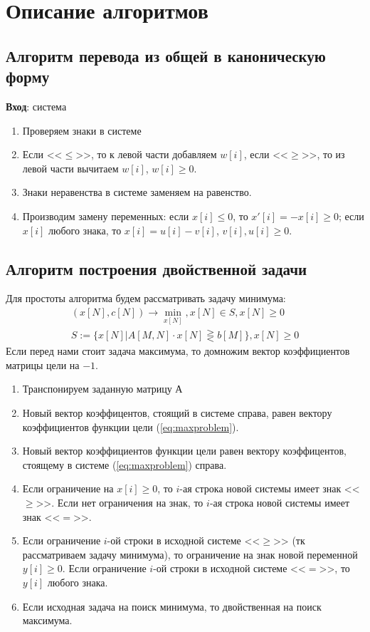 \documentclass[main.tex]{subfiles}
\begin{document}
	\newpage
	\section{Описание алгоритмов}
	\subsection{Алгоритм перевода из общей в каноническую форму}
	\textbf{Вход}: система
	\begin{enumerate}
		\item Проверяем знаки в системе
		\item Если <<$\le$>>, то к левой части добавляем $w[i]$, если <<$\ge$>>, то из левой части вычитаем $w[i]$, $w[i]\ge0$.
		\item Знаки неравенства в системе заменяем на равенство.
		\item Производим замену переменных: если $x[i]\le0$, то $x'[i]=-x[i]\ge0$; если $x[i]$ любого знака, то $x[i]=u[i]-v[i]$, $v[i],u[i] \ge 0$.
	\end{enumerate}
	\subsection{Алгоритм построения двойственной задачи}
	Для простоты алгоритма будем рассматривать задачу минимума:
	\begin{equation}\label{eq:maxproblem}
	\begin{array}{ll}
	(x[N],c[N])\longrightarrow \min_{x[N]}, x[N] \in S, x[N] \ge 0\\
	S :=\{x[N]|A[M,N]\cdot x[N] \gtreqless b[M]\}, x[N] \ge 0
	\end{array}
	\end{equation}
	Если перед нами стоит задача максимума, то домножим вектор коэффициентов матрицы цели на $-1$.
	\begin{enumerate}
		\item Транспонируем заданную матрицу $А$
		\item Новый вектор коэффицентов, стоящий в системе справа, равен вектору коэффициентов функции цели (\ref{eq:maxproblem}).
		\item Новый вектор коэффициентов функции цели равен вектору коэффицентов, стоящему в системе (\ref{eq:maxproblem}) справа.
		\item Если ограничение на $x[i]\ge0$, то $i$-ая строка новой системы имеет знак <<$\ge$>>.
		Если нет ограничения на знак, то $i$-ая строка новой системы имеет знак <<$=$>>.
		\item Если ограничение $i$-ой строки в исходной системе <<$\ge$>> (тк рассматриваем задачу  минимума), то ограничение на знак новой переменной $y[i]\ge0$.
		Если ограничение $i$-ой строки в исходной системе <<$=$>>, то $y[i]$ любого знака.
		\item Если исходная задача на поиск минимума, то двойственная на поиск максимума.
	\end{enumerate}
\end{document}
